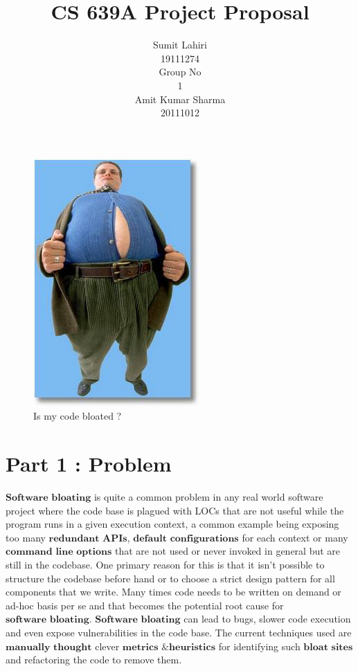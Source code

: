 \documentclass{article} %
\title{CS 639A Project Proposal}
\author{
Sumit Lahiri \\
19111274 \\
\And
Group No\\
1\\
\And
Amit Kumar Sharma \\
20111012\\
}
\begin{document}
\maketitle

\begin{figure}[htbp]
\centerline{\includegraphics[scale=0.3]{bloat.jpg}}
\caption{Is my code bloated ?}
\label{fig}
\end{figure}

\section*{Part 1 : Problem}
$\textbf{Software bloating}$ is quite a common problem in any real world software project where the code base is plagued with LOCs that are not useful while the program runs in a given execution context, a common example being exposing too many $\textbf{redundant APIs}$, $\textbf{default configurations}$ for each context or many $\textbf{command line options}$ that are not used or never invoked in general but are still in the codebase. One primary reason for this is that it isn't possible to structure the codebase before hand or to choose a strict design pattern for all components that we write. Many times code needs to be written on demand or ad-hoc basis per se and that becomes the potential root cause for $\textbf{software bloating}$. $\textbf{Software bloating}$ can lead to bugs, slower code execution and even expose vulnerabilities in the code base. The current techniques used are $\textbf{manually thought}$ clever $\textbf{metrics \& heuristics}$ for identifying such $\textbf{bloat sites}$ and refactoring the code to remove them. 
\end{document}
